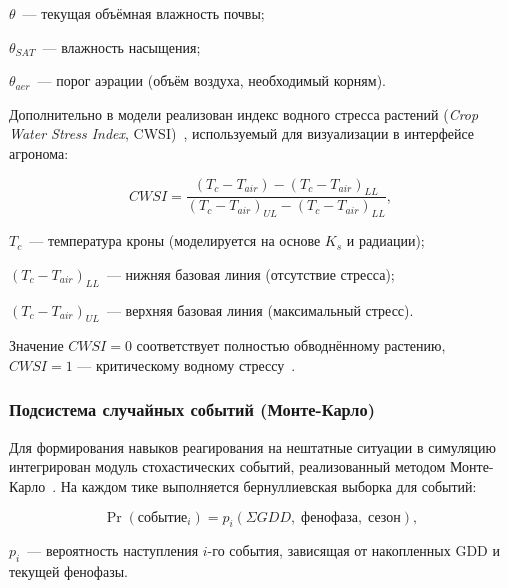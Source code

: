 \begin{where}
	\item $\theta$~--- текущая объёмная влажность почвы;
	\item $\theta_{SAT}$~--- влажность насыщения;
	\item $\theta_{aer}$~--- порог аэрации (объём воздуха, необходимый корням).
\end{where}

Дополнительно в модели реализован индекс водного стресса
растений (\emph{Crop Water Stress Index},
CWSI)~\cite{jackson1988_cwsi,idso1981_cwsi}, используемый
для визуализации в интерфейсе агронома:

\begin{equation}
	CWSI = \frac{(T_c - T_{air}) - (T_c - T_{air})_{LL}}{(T_c - T_{air})_{UL} - (T_c - T_{air})_{LL}},
	\label{eq:cwsi}
\end{equation}

\begin{where}
	\item $T_c$~--- температура кроны (моделируется на основе $K_s$ и радиации);
	\item $(T_c - T_{air})_{LL}$~--- нижняя базовая линия (отсутствие стресса);
	\item $(T_c - T_{air})_{UL}$~--- верхняя базовая линия (максимальный стресс).
\end{where}

Значение $CWSI = 0$ соответствует полностью обводнённому
растению, $CWSI = 1$ --- критическому водному
стрессу~\cite{zhou2024_cwsi_maize,katimbo2021_cwsi_rootzone}.

\subsubsection{Подсистема случайных событий (Монте-Карло)}

Для формирования навыков реагирования на нештатные ситуации
в симуляцию интегрирован модуль стохастических событий,
реализованный методом Монте-Карло~\cite{sun2025_monte_carlo_crop,
	jones2017_bayesian_sugarcane,graveline2012_monte_carlo_farming}.
На каждом тике выполняется бернуллиевская выборка для событий:

\begin{equation}
	\Pr(\text{событие}_i) = p_i(\Sigma GDD, \; \text{фенофаза}, \; \text{сезон}),
	\label{eq:event_probability}
\end{equation}

\begin{where}
	\item $p_i$~--- вероятность наступления $i$-го события, зависящая от накопленных GDD и текущей фенофазы.
\end{where}

